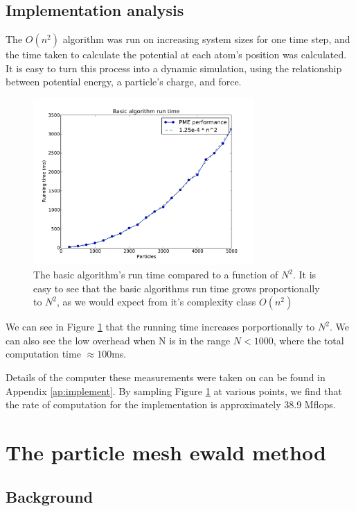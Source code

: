 \documentclass[pdftex,twoside,a4paper]{report}
\newcommand{\bcen}{\begin{center}}
\newcommand{\ecen}{\end{center}}
\begin{document}
\subsection{Implementation analysis}
The $O(n^2)$ algorithm was run on increasing system sizes for one time step, and the time taken to calculate the potential at each atom's position was calculated. It is easy to turn this process into a dynamic simulation, using the relationship between potential energy, a particle's charge, and force.
\begin{figure}
\bcen \includegraphics[width=0.75\textwidth]{figures/graphs/basic_algo_complex.pdf} \ecen
\caption{The basic algorithm's run time compared to a function of $N^2$. It is easy to see that the basic algorithms run time grows proportionally to $N^2$, as we would expect from it's complexity class $O(n^2)$}
\label{fig:basic_algo_complex}
\end{figure}

We can see in Figure \ref{fig:basic_algo_complex} that the running time increases porportionally to $N^2$. We can also see the low overhead when N is in the range $N < 1000$, where the total computation time $\approx 100$ms.

Details of the computer these measurements were taken on can be found in Appendix \ref{ap:implement}. By sampling Figure \ref{fig:basic_algo_complex} at various points, we find that the rate of computation for the implementation is approximately 38.9 Mflops.

\section{The particle mesh ewald method}
\subsection{Background}
\end{document}
